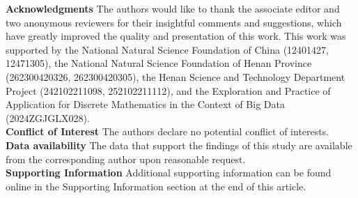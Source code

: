 \documentclass[12pt, eqno, limlimits]{article}
\begin{document}
\begin{sloppypar}
        \noindent \textbf{Acknowledgments} The authors would like to thank the associate editor and two anonymous reviewers for their insightful comments and suggestions, which have greatly improved the quality and presentation of this work. This work was supported by the National Natural Science Foundation of China (12401427, 12471305), the National Natural Science Foundation of Henan Province (262300420326, 262300420305), the Henan Science and Technology Department Project (242102211098, 252102211112), and the Exploration and Practice of Application for Discrete Mathematics in the Context of Big Data (2024ZGJGLX028).\\
        
        \noindent \textbf{Conflict of Interest} The authors declare no potential conflict of interests.\\
        
        \noindent \textbf{Data availability}  The data that support the findings of this study are available from the corresponding author upon reasonable request.\\
        
        \noindent \textbf{Supporting Information}
        Additional supporting information can be found online in the Supporting Information section at the end of this article.
        
    \end{sloppypar}
    
    
    
    
    
    
\end{document}
